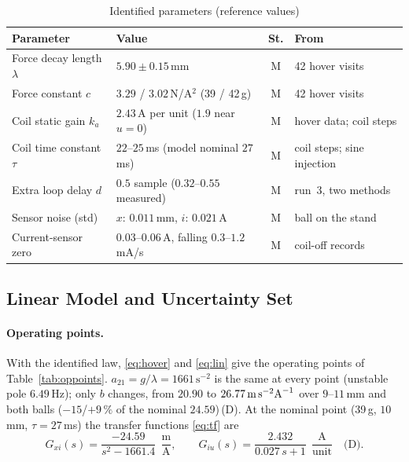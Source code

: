 \documentclass[11pt,a4paper]{article}
\newcommand{\st}[1]{\,\textup{(#1)}}
\begin{document}
\begin{table}[H]
\centering
\caption{Identified parameters (reference values)}
\label{tab:identified}
\begin{tabularx}{\linewidth}{@{}>{\raggedright\arraybackslash}p{4.0cm}>{\raggedright\arraybackslash}p{4.6cm}cX@{}}
\toprule
Parameter & Value & St. & From \\
\midrule
Force decay length $\lambda$ & $5.90 \pm 0.15$\,mm & M & 42 hover visits \\
Force constant $c$ & $3.29$ / $3.02$\,N/A$^2$ (39 / 42\,g) & M & 42 hover visits \\
Coil static gain $k_a$ & $2.43$\,A per unit ($1.9$ near $u=0$) & M & hover data; coil steps \\
Coil time constant $\tau$ & $22$--$25$\,ms (model nominal $27$\,ms) & M & coil steps; sine injection \\
Extra loop delay $d$ & $0.5$ sample ($0.32$--$0.55$ measured) & M & run~3, two methods \\
Sensor noise (std) & $x$: $0.011$\,mm, $i$: $0.021$\,A & M & ball on the stand \\
Current-sensor zero & $0.03$--$0.06$\,A, falling $0.3$--$1.2$\,mA/s & M & coil-off records \\
\bottomrule
\end{tabularx}
\end{table}

\subsection{Linear Model and Uncertainty Set}
\label{sec:obs-unc}
\paragraph{Operating points.} With the identified law, \eqref{eq:hover} and \eqref{eq:lin} give the operating points of
Table~\ref{tab:oppoints}. $a_{21} = g/\lambda = 1661\,\text{s}^{-2}$ is the same at every point (unstable pole $6.49$\,Hz);
only $b$ changes, from $20.90$ to $26.77\,\text{m\,s}^{-2}\text{A}^{-1}$ over $9$--$11$\,mm and both balls ($-15$/$+9\,\%$ of the
nominal $24.59$)\st{D}. At the nominal point (39\,g, $10$\,mm, $\tau = 27$\,ms) the transfer functions \eqref{eq:tf} are
\begin{equation}
G_{xi}(s) = \frac{-24.59}{s^2 - 1661.4}\ \ \frac{\text{m}}{\text{A}}, \qquad
G_{iu}(s) = \frac{2.432}{0.027\,s + 1}\ \ \frac{\text{A}}{\text{unit}} \quad\text{(D)}.
\label{eq:tfnom}
\end{equation}
\end{document}
